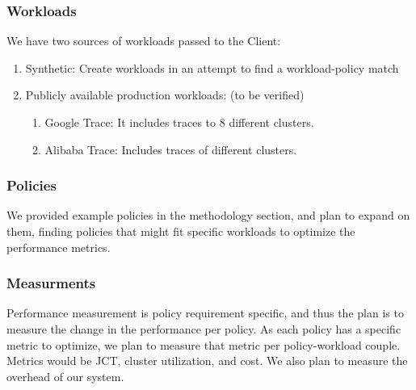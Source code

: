 \subsubsection{Workloads}
We have two sources of workloads passed to the Client:
\begin{enumerate}
    \item Synthetic: Create workloads in an attempt to find a workload-policy match
    \item Publicly available production workloads: (to be verified)
        \begin{enumerate}
            \item Google Trace: It includes traces to 8 different clusters. %
            \item Alibaba Trace: Includes traces of different clusters. %
        \end{enumerate}
\end{enumerate}

\subsubsection{Policies}
We provided example policies in the methodology section, and plan to expand on them, finding policies that might 
fit specific workloads to optimize the performance metrics. 

\subsubsection{Measurments}
Performance measurement is policy requirement specific, and thus the plan is to measure the change in the performance 
per policy. As each policy has a specific metric to optimize, we plan to measure that metric per policy-workload couple. 
Metrics would be JCT, cluster utilization, and cost. We also plan to measure the overhead of our system.